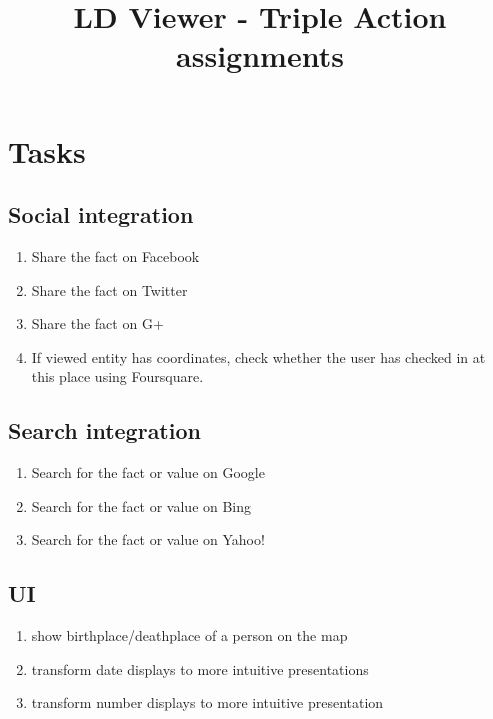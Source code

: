 \documentclass{article}
\begin{document}
\title{LD Viewer - Triple Action assignments}
\date{}
\maketitle



\section{Tasks}
\subsection{Social integration}
\begin{enumerate}
\item Share the fact on Facebook
\item Share the fact on Twitter
\item Share the fact on G+
\item If viewed entity has coordinates, check whether the user has checked in at this place using Foursquare.
\end{enumerate}

\subsection{Search integration}
\begin{enumerate}
\item Search for the fact or value on Google
\item Search for the fact or value on Bing
\item Search for the fact or value on Yahoo!
\end{enumerate}

\subsection{UI}
\begin{enumerate}
\item show birthplace/deathplace of a person on the map
\item transform date displays to more intuitive presentations
\item transform number displays to more intuitive presentation
\end{enumerate}
\end{document}
